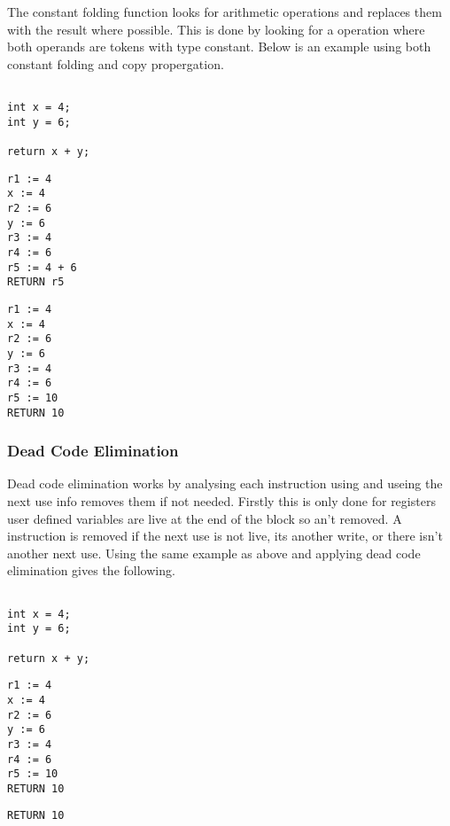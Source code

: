 \documentclass{article}
\begin{document}
The constant folding function looks for arithmetic operations and replaces them
with the result where possible. This is done by looking for a operation where both
operands are tokens with type constant. Below is an example using both constant
folding and copy propergation.

\begin{minipage}{0.3\textwidth}
\begin{lstlisting}

int x = 4;
int y = 6;

return x + y;

\end{lstlisting}
\end{minipage}%
\begin{minipage}{0.3\textwidth}
\begin{lstlisting}
r1 := 4
x := 4
r2 := 6
y := 6
r3 := 4
r4 := 6
r5 := 4 + 6
RETURN r5

\end{lstlisting}
\end{minipage}%
\begin{minipage}{0.3\textwidth}
\begin{lstlisting}
r1 := 4
x := 4
r2 := 6
y := 6
r3 := 4
r4 := 6
r5 := 10
RETURN 10
\end{lstlisting}
\end{minipage}%

\subsubsection{Dead Code Elimination}

Dead code elimination works by analysing each instruction using and useing the
next use info removes them if not needed. Firstly this is only done for registers
user defined variables are live at the end of the block so an't removed. A instruction
is removed if the next use is not live, its another write, or there isn't another
next use. Using the same example as above and applying dead code elimination gives
the following.

\begin{minipage}{0.3\textwidth}
\begin{lstlisting}

int x = 4;
int y = 6;

return x + y;

\end{lstlisting}
\end{minipage}%
\begin{minipage}{0.3\textwidth}
\begin{lstlisting}
r1 := 4
x := 4
r2 := 6
y := 6
r3 := 4
r4 := 6
r5 := 10
RETURN 10

\end{lstlisting}
\end{minipage}%
\begin{minipage}{0.3\textwidth}
\begin{lstlisting}
RETURN 10
\end{lstlisting}
\end{minipage}%
\end{document}
